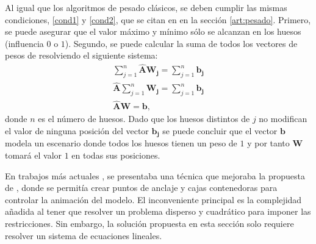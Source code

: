 Al igual que los algoritmos de pesado clásicos, se deben cumplir las mismas condiciones, \ref{cond1} y \ref{cond2}, que se citan en en la sección \ref{art:pesado}. %
Primero, se puede asegurar que el valor máximo y mínimo sólo se alcanzan en los huesos (influencia $0$ o $1$).
Segundo, se puede calcular la suma de todos los vectores de pesos de resolviendo el siguiente sistema:
\begin{eqnarray}
\sum^{n}_{j=1} \mathbf{\hat{A}} \mathbf{W_j} = \sum^{n}_{j=1} \mathbf{b_j} \\
\mathbf{\hat{A}} \sum^{n}_{j=1} \mathbf{W_j} = \sum^{n}_{j=1}\mathbf{b_j} \\
\mathbf{\hat{A}} \mathbf{W}=\mathbf{b},
\end{eqnarray}
donde $n$ es el número de huesos. Dado que los huesos distintos de $j$ no modifican el valor de ninguna posición del vector $\mathbf{b_j}$ se puede concluir que el vector $\mathbf{b}$ modela un escenario donde todos los huesos tienen un peso de $1$ y por tanto $\mathbf{W}$  tomará el valor $1$ en todas sus posiciones. 





En trabajos más actuales \cite{Jacobson:2011}, se presentaba una técnica que mejoraba la propuesta de \cite{Baran:2007}, donde se permitía crear puntos de anclaje y cajas contenedoras para controlar la animación del modelo. 
El inconveniente principal es la complejidad añadida al tener que resolver un problema disperso y cuadrático para imponer las restricciones. Sin embargo, la solución propuesta en esta sección solo requiere resolver un sistema de ecuaciones lineales. 


